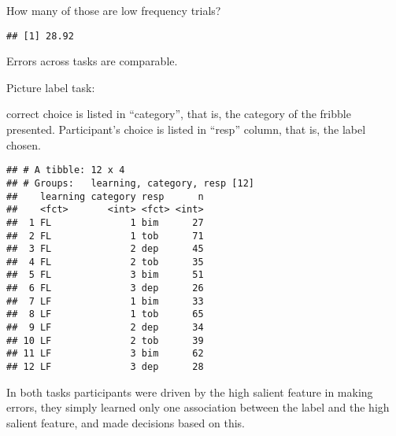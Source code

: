 \documentclass[
]{article}
\newenvironment{Shaded}{\begin{snugshade}}{\end{snugshade}}
\newcommand{\DecValTok}[1]{\textcolor[rgb]{0.00,0.00,0.81}{#1}}
\newcommand{\KeywordTok}[1]{\textcolor[rgb]{0.13,0.29,0.53}{\textbf{#1}}}
\newcommand{\NormalTok}[1]{#1}
\newcommand{\OperatorTok}[1]{\textcolor[rgb]{0.81,0.36,0.00}{\textbf{#1}}}
\newcommand{\StringTok}[1]{\textcolor[rgb]{0.31,0.60,0.02}{#1}}
\begin{document}
How many of those are low frequency trials?

\begin{Shaded}
\end{Shaded}

\begin{verbatim}
## [1] 28.92
\end{verbatim}

Errors across tasks are comparable.

Picture label task:

correct choice is listed in ``category'', that is, the category of the
fribble presented. Participant's choice is listed in ``resp'' column,
that is, the label chosen.

\begin{Shaded}
\end{Shaded}

\begin{verbatim}
## # A tibble: 12 x 4
## # Groups:   learning, category, resp [12]
##    learning category resp      n
##    <fct>       <int> <fct> <int>
##  1 FL              1 bim      27
##  2 FL              1 tob      71
##  3 FL              2 dep      45
##  4 FL              2 tob      35
##  5 FL              3 bim      51
##  6 FL              3 dep      26
##  7 LF              1 bim      33
##  8 LF              1 tob      65
##  9 LF              2 dep      34
## 10 LF              2 tob      39
## 11 LF              3 bim      62
## 12 LF              3 dep      28
\end{verbatim}

In both tasks participants were driven by the high salient feature in
making errors, they simply learned only one association between the
label and the high salient feature, and made decisions based on this.
\end{document}
